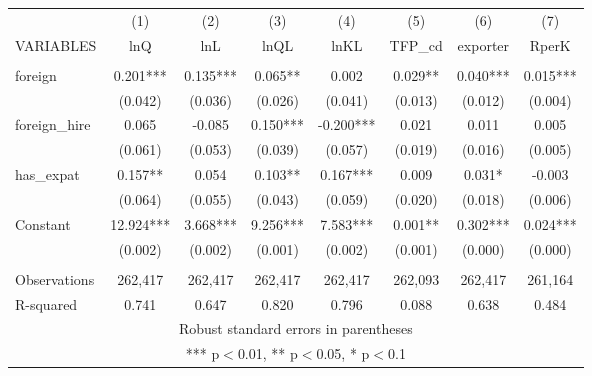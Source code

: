 \begin{tabular}{lccccccc} \hline
 & (1) & (2) & (3) & (4) & (5) & (6) & (7) \\
VARIABLES & lnQ & lnL & lnQL & lnKL & TFP\_cd & exporter & RperK \\ \hline
 &  &  &  &  &  &  &  \\
foreign & 0.201*** & 0.135*** & 0.065** & 0.002 & 0.029** & 0.040*** & 0.015*** \\
 & (0.042) & (0.036) & (0.026) & (0.041) & (0.013) & (0.012) & (0.004) \\
foreign\_hire & 0.065 & -0.085 & 0.150*** & -0.200*** & 0.021 & 0.011 & 0.005 \\
 & (0.061) & (0.053) & (0.039) & (0.057) & (0.019) & (0.016) & (0.005) \\
has\_expat & 0.157** & 0.054 & 0.103** & 0.167*** & 0.009 & 0.031* & -0.003 \\
 & (0.064) & (0.055) & (0.043) & (0.059) & (0.020) & (0.018) & (0.006) \\
Constant & 12.924*** & 3.668*** & 9.256*** & 7.583*** & 0.001** & 0.302*** & 0.024*** \\
 & (0.002) & (0.002) & (0.001) & (0.002) & (0.001) & (0.000) & (0.000) \\
 &  &  &  &  &  &  &  \\
Observations & 262,417 & 262,417 & 262,417 & 262,417 & 262,093 & 262,417 & 261,164 \\
 R-squared & 0.741 & 0.647 & 0.820 & 0.796 & 0.088 & 0.638 & 0.484 \\ \hline
\multicolumn{8}{c}{ Robust standard errors in parentheses} \\
\multicolumn{8}{c}{ *** p$<$0.01, ** p$<$0.05, * p$<$0.1} \\
\end{tabular}
